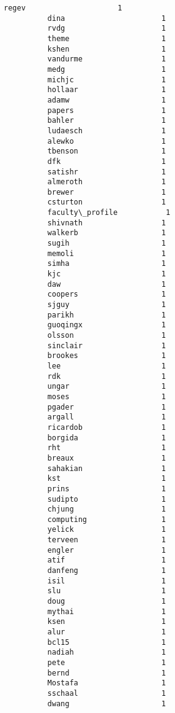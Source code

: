 \documentclass[11pt]{article}
\begin{document}
\begin{Verbatim}[commandchars=\\\{\}]
          regev                     1
          dina                      1
          rvdg                      1
          theme                     1
          kshen                     1
          vandurme                  1
          medg                      1
          michjc                    1
          hollaar                   1
          adamw                     1
          papers                    1
          bahler                    1
          ludaesch                  1
          alewko                    1
          tbenson                   1
          dfk                       1
          satishr                   1
          almeroth                  1
          brewer                    1
          csturton                  1
          faculty\_profile           1
          shivnath                  1
          walkerb                   1
          sugih                     1
          memoli                    1
          simha                     1
          kjc                       1
          daw                       1
          coopers                   1
          sjguy                     1
          parikh                    1
          guoqingx                  1
          olsson                    1
          sinclair                  1
          brookes                   1
          lee                       1
          rdk                       1
          ungar                     1
          moses                     1
          pgader                    1
          argall                    1
          ricardob                  1
          borgida                   1
          rht                       1
          breaux                    1
          sahakian                  1
          kst                       1
          prins                     1
          sudipto                   1
          chjung                    1
          computing                 1
          yelick                    1
          terveen                   1
          engler                    1
          atif                      1
          danfeng                   1
          isil                      1
          slu                       1
          doug                      1
          mythai                    1
          ksen                      1
          alur                      1
          bcl15                     1
          nadiah                    1
          pete                      1
          bernd                     1
          Mostafa                   1
          sschaal                   1
          dwang                     1

\end{Verbatim}
\end{document}
